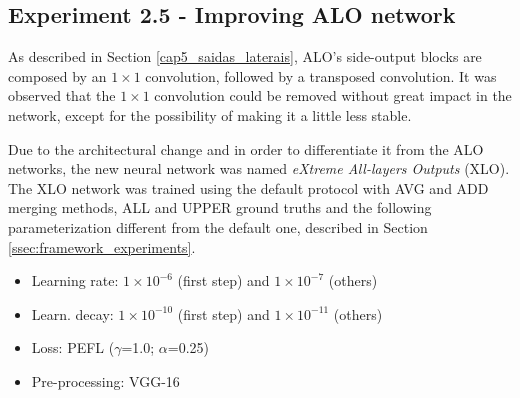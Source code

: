 \subsection{Experiment 2.5 - Improving ALO network}
\label{ssec:bsds_subexp5}

% 

As described in Section \ref{cap5_saidas_laterais}, ALO's side-output blocks are composed by an $1 \times 1$ convolution, followed by a transposed convolution.
It was observed that the $1 \times 1$ convolution could be removed without great impact in the network, except for the possibility of making it a little less stable.

Due to the architectural change and in order to differentiate it from the ALO networks, the new neural network was named \textit{eXtreme All-layers Outputs}  (XLO).
The XLO network was trained using the default protocol with AVG and ADD merging methods, ALL and UPPER ground truths and the following parameterization different from the default one, described in Section \ref{ssec:framework_experiments}.

\begin{itemize}
  \item Learning rate: $1 \times 10^{-6}$ (first step) and $1 \times 10^{-7}$ (others)
  \item Learn. decay: $1 \times 10^{-10}$ (first step) and $1 \times 10^{-11}$ (others)
  \item Loss: PEFL ($\gamma$=1.0; $\alpha$=0.25)
  \item Pre-processing: VGG-16
\end{itemize}

